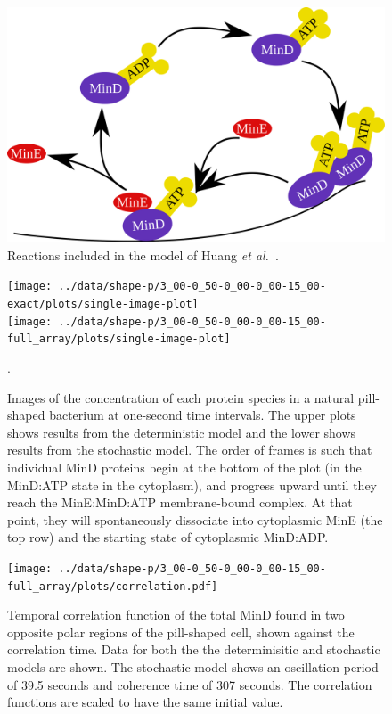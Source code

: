 \documentclass{pnastwo}
\begin{document}
\begin{figure}
  \includegraphics[width=\columnwidth]{reactions}
  \caption{Reactions included in the model of Huang \emph{et
      al.}~\cite{huang2003dynamic}.}\label{fig:reactions}
\end{figure}

\begin{figure}
  \begin{center}
    \texttt{[image: ../data/shape-p/3\_00-0\_50-0\_00-0\_00-15\_00-exact/plots/single-image-plot]}\\
    \vspace{-1.5em}
    \texttt{[image: ../data/shape-p/3\_00-0\_50-0\_00-0\_00-15\_00-full\_array/plots/single-image-plot]}
    \vspace{-1.5em}
  \end{center}
  \caption{Images of the concentration of each protein species in a
    natural pill-shaped bacterium at one-second time intervals. The
    upper plots shows results from the deterministic model and the
    lower shows results from the stochastic model.  The order of
    frames is such that individual MinD proteins begin at the bottom
    of the plot (in the MinD:ATP state in the cytoplasm), and progress
    upward until they reach the MinE:MinD:ATP membrane-bound complex.
    At that point, they will spontaneously dissociate into cytoplasmic
    MinE (the top row) and the starting state of cytoplasmic
    MinD:ADP.}.
  \label{image-p}
\end{figure}

\begin{figure}
  \texttt{[image: ../data/shape-p/3\_00-0\_50-0\_00-0\_00-15\_00-full\_array/plots/correlation.pdf]}
  \caption{Temporal correlation function of the total MinD found in
    two opposite polar regions of the pill-shaped cell, shown against
    the correlation time.  Data for both the the determinisitic and
    stochastic models are shown.  The stochastic model shows an
    oscillation period of 39.5 seconds and coherence time of 307 seconds.
    The correlation functions are scaled to have the same initial
    value.}
  \label{corr-pill}
\end{figure}
\end{document}
